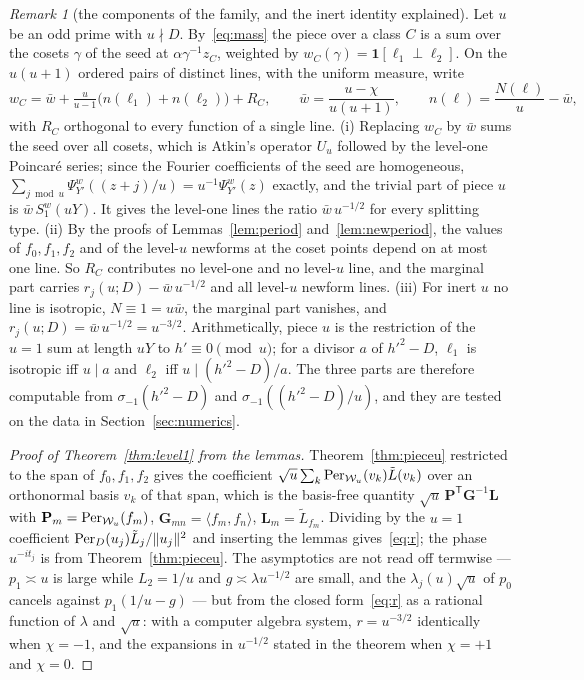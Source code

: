 \documentclass[11pt,a4paper]{article}
\theoremstyle{remark}\newtheorem{remark}[theorem]{Remark}
\begin{document}
\begin{remark}[the components of the family, and the inert identity explained]\label{rem:components}
Let $u$ be an odd prime with $u\nmid D$. By~\eqref{eq:mass} the piece over a class $C$ is a sum over the cosets $\gamma$ of the
seed at $\alpha\gamma^{-1}z_C$, weighted by $w_C(\gamma)=\mathbf 1[\ell_1\perp\ell_2]$. On the $u(u+1)$ ordered pairs of distinct lines, with the
uniform measure, write
\[
w_C=\bar w+\tfrac u{u-1}\bigl(n(\ell_1)+n(\ell_2)\bigr)+R_C,\qquad \bar w=\frac{u-\chi}{u(u+1)},\qquad n(\ell)=\frac{N(\ell)}u-\bar w,
\]
with $R_C$ orthogonal to every function of a single line. (i) Replacing $w_C$ by $\bar w$ sums the seed over all cosets, which
is Atkin's operator $U_u$ followed by the level-one Poincar\'e series; since the Fourier coefficients of the seed are homogeneous,
$\sum_{j\bmod u}\Psi^w_{Y'}((z+j)/u)=u^{-1}\Psi^w_{Y'}(z)$ exactly, and the trivial part of piece $u$ is $\bar w\,S^w_1(uY)$. It gives
the level-one lines the ratio $\bar w\,u^{-1/2}$ for every splitting type. (ii) By the proofs of Lemmas~\ref{lem:period}
and~\ref{lem:newperiod}, the values of $f_0,f_1,f_2$ and of the level-$u$ newforms at the coset points depend on at most one
line. So $R_C$ contributes no level-one and no level-$u$ line, and the marginal part carries $r_j(u;D)-\bar w\,u^{-1/2}$ and
all level-$u$ newform lines. (iii) For inert $u$ no line is isotropic, $N\equiv1=u\bar w$, the marginal part vanishes, and
$r_j(u;D)=\bar w\,u^{-1/2}=u^{-3/2}$. Arithmetically, piece $u$ is the restriction of the $u=1$ sum at length $uY$ to
$h'\equiv0\pmod u$; for a divisor $a$ of $h'^2-D$, $\ell_1$ is isotropic iff $u\mid a$ and $\ell_2$ iff $u\mid(h'^2-D)/a$. The three
parts are therefore computable from $\sigma_{-1}(h'^2-D)$ and $\sigma_{-1}((h'^2-D)/u)$, and they are tested on the data in
Section~\ref{sec:numerics}.
\end{remark}

\begin{proof}[Proof of Theorem~\ref{thm:level1} from the lemmas]
Theorem~\ref{thm:pieceu} restricted to the span of $f_0,f_1,f_2$ gives the coefficient $\sqrt u\sum_k\mathrm{Per}_{\mathcal W_u}(v_k)\tilde L(v_k)$
over an orthonormal basis $v_k$ of that span, which is the basis-free quantity $\sqrt u\,\mathbf P^{\mathsf T}\mathbf G^{-1}\mathbf L$
with $\mathbf P_m=\mathrm{Per}_{\mathcal W_u}(f_m)$, $\mathbf G_{mn}=\langle f_m,f_n\rangle$, $\mathbf L_m=\tilde L_{f_m}$. Dividing by
the $u=1$ coefficient $\mathrm{Per}_D(u_j)\tilde L_j/\|u_j\|^2$ and inserting the lemmas gives~\eqref{eq:r}; the phase $u^{-it_j}$
is from Theorem~\ref{thm:pieceu}. The asymptotics are not read off termwise --- $p_1\asymp u$ is large while $L_2=1/u$ and
$g\asymp\lambda u^{-1/2}$ are small, and the $\lambda_j(u)\sqrt u$ of $p_0$ cancels against $p_1(1/u-g)$ --- but from the closed
form~\eqref{eq:r} as a rational function of $\lambda$ and $\sqrt u$: with a computer algebra system, $r=u^{-3/2}$ identically
when $\chi=-1$, and the expansions in $u^{-1/2}$ stated in the theorem when $\chi=+1$ and $\chi=0$.
\end{proof}
\end{document}
